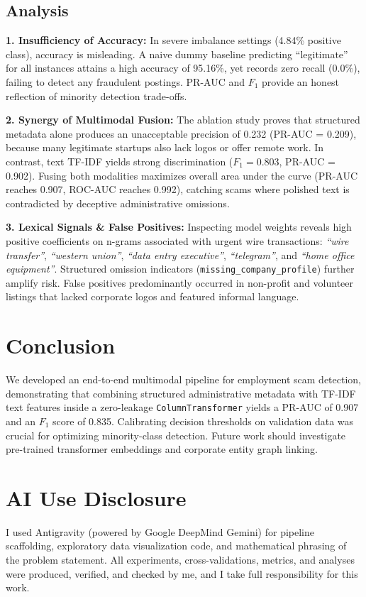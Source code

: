 \documentclass[conference]{IEEEtran}
\begin{document}
\subsection{Analysis}
\textbf{1. Insufficiency of Accuracy:} In severe imbalance settings (4.84\% positive class), accuracy is misleading. A naive dummy baseline predicting ``legitimate'' for all instances attains a high accuracy of 95.16\%, yet records zero recall ($0.0\%$), failing to detect any fraudulent postings. PR-AUC and $F_1$ provide an honest reflection of minority detection trade-offs.

\textbf{2. Synergy of Multimodal Fusion:} The ablation study proves that structured metadata alone produces an unacceptable precision of 0.232 (PR-AUC = 0.209), because many legitimate startups also lack logos or offer remote work. In contrast, text TF-IDF yields strong discrimination ($F_1 = 0.803$, PR-AUC = 0.902). Fusing both modalities maximizes overall area under the curve (PR-AUC reaches 0.907, ROC-AUC reaches 0.992), catching scams where polished text is contradicted by deceptive administrative omissions.

\textbf{3. Lexical Signals \& False Positives:} Inspecting model weights reveals high positive coefficients on n-grams associated with urgent wire transactions: \emph{``wire transfer''}, \emph{``western union''}, \emph{``data entry executive''}, \emph{``telegram''}, and \emph{``home office equipment''}. Structured omission indicators (\texttt{missing\_company\_profile}) further amplify risk. False positives predominantly occurred in non-profit and volunteer listings that lacked corporate logos and featured informal language.

\section{Conclusion}
We developed an end-to-end multimodal pipeline for employment scam detection, demonstrating that combining structured administrative metadata with TF-IDF text features inside a zero-leakage \texttt{ColumnTransformer} yields a PR-AUC of 0.907 and an $F_1$ score of 0.835. Calibrating decision thresholds on validation data was crucial for optimizing minority-class detection. Future work should investigate pre-trained transformer embeddings and corporate entity graph linking.

\section*{AI Use Disclosure}
I used Antigravity (powered by Google DeepMind Gemini) for pipeline scaffolding, exploratory data visualization code, and mathematical phrasing of the problem statement. All experiments, cross-validations, metrics, and analyses were produced, verified, and checked by me, and I take full responsibility for this work.
\end{document}
